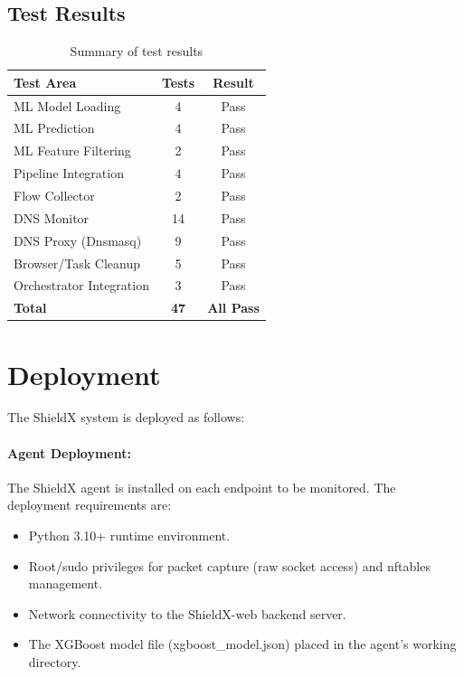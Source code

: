 \documentclass[../Main.tex]{subfiles}
\begin{document}
\subsection{Test Results}

\begin{table}[H]
\centering
\small
\begin{tabular}{|l|c|c|}
\hline
\textbf{Test Area} & \textbf{Tests} & \textbf{Result} \\
\hline
ML Model Loading & 4 & Pass \\
ML Prediction & 4 & Pass \\
ML Feature Filtering & 2 & Pass \\
Pipeline Integration & 4 & Pass \\
Flow Collector & 2 & Pass \\
DNS Monitor & 14 & Pass \\
DNS Proxy (Dnsmasq) & 9 & Pass \\
Browser/Task Cleanup & 5 & Pass \\
Orchestrator Integration & 3 & Pass \\
\hline
\textbf{Total} & \textbf{47} & \textbf{All Pass} \\
\hline
\end{tabular}
\caption{Summary of test results}
\label{tab:test_results}
\end{table}

\section{Deployment}
\label{section:4.5}

The ShieldX system is deployed as follows:

\paragraph{Agent Deployment:} The ShieldX agent is installed on each endpoint to be monitored. The deployment requirements are:
\begin{itemize}
    \item Python 3.10+ runtime environment.
    \item Root/sudo privileges for packet capture (raw socket access) and nftables management.
    \item Network connectivity to the ShieldX-web backend server.
    \item The XGBoost model file (xgboost\_model.json) placed in the agent's working directory.
\end{itemize}
\end{document}
